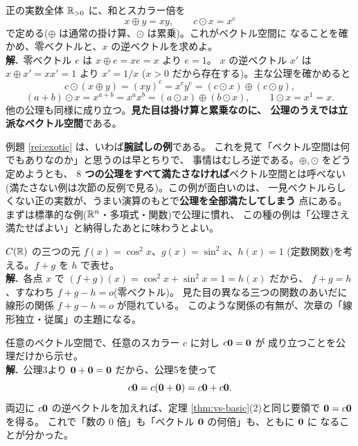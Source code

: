 \begin{rei}[例題・標準(検証)]\label{rei:exotic}
正の実数全体 $\mathbb{R}_{>0}$ に、和とスカラー倍を
\[
x \oplus y = xy, \qquad c \odot x = x^c
\]
で定める($\oplus$ は通常の掛け算、$\odot$ は累乗)。これがベクトル空間に
なることを確かめ、零ベクトルと、$x$ の逆ベクトルを求めよ。\\
\textbf{解.}\ 零ベクトル $e$ は $x \oplus e = xe = x$ より $e = 1$。
$x$ の逆ベクトル $x'$ は $x \oplus x' = x x' = 1$ より $x' = 1/x$
($x > 0$ だから存在する)。主な公理を確かめると
\[
c \odot (x \oplus y) = (xy)^c = x^c y^c = (c \odot x) \oplus (c \odot y),
\]
\[
(a + b) \odot x = x^{a+b} = x^a x^b = (a \odot x) \oplus (b \odot x), \qquad
1 \odot x = x^1 = x.
\]
他の公理も同様に成り立つ。\textbf{見た目は掛け算と累乗なのに、
公理のうえでは立派なベクトル空間}である。
\end{rei}

\begin{chui}
例題 \ref{rei:exotic} は、いわば\textbf{腕試しの例}である。
これを見て「ベクトル空間は何でもありなのか」と思うのは早とちりで、
事情はむしろ逆である。$\oplus, \odot$ をどう定めようとも、
\textbf{$8$ つの公理をすべて満たさなければ}ベクトル空間とは呼べない
(満たさない例は次節の反例で見る)。この例が面白いのは、
一見ベクトルらしくない正の実数が、うまい演算のもとで\textbf{公理を全部満たしてしまう}
点にある。まずは標準的な例($\mathbb{R}^n$・多項式・関数)で公理に慣れ、
この種の例は「公理さえ満たせばよい」と納得したあとに味わうとよい。
\end{chui}

\begin{rei}[例題・標準(計算と関係)]
$C(\mathbb{R})$ の三つの元 $f(x) = \cos^2 x$、$g(x) = \sin^2 x$、$h(x) = 1$
(定数関数)を考える。$f + g$ を $h$ で表せ。\\
\textbf{解.}\ 各点 $x$ で $(f + g)(x) = \cos^2 x + \sin^2 x = 1 = h(x)$ だから、
$f + g = h$、すなわち $f + g - h = o$(零ベクトル)。
見た目の異なる三つの関数のあいだに線形の関係 $f + g - h = o$ が隠れている。
このような関係の有無が、次章の「線形独立・従属」の主題になる。
\end{rei}

\begin{rei}[例題・標準(証明)]\label{rei:czero}
任意のベクトル空間で、任意のスカラー $c$ に対し $c\bm{0} = \bm{0}$ が
成り立つことを公理だけから示せ。\\
\textbf{解.}\ 公理3より $\bm{0} + \bm{0} = \bm{0}$ だから、公理5を使って
\[
c\bm{0} = c(\bm{0} + \bm{0}) = c\bm{0} + c\bm{0}.
\]
両辺に $c\bm{0}$ の逆ベクトルを加えれば、定理 \ref{thm:vs-basic}(2)と同じ要領で
$\bm{0} = c\bm{0}$ を得る。
これで「数の $0$ 倍」も「ベクトル $\bm{0}$ の何倍」も、ともに $\bm{0}$ に
なることが分かった。
\end{rei}

